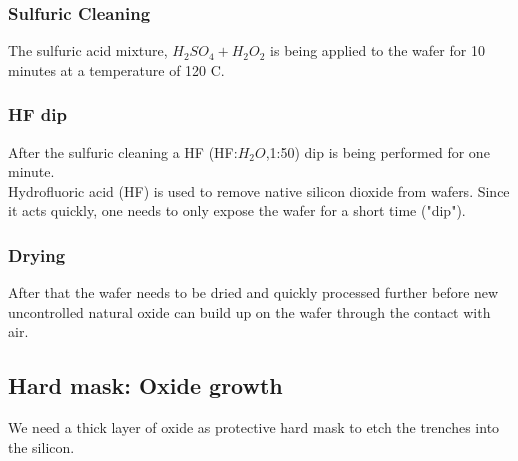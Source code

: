 \subsubsection{Sulfuric Cleaning}
The sulfuric acid mixture, $H_2 S O_4 + H_2 O_2$ is being applied to the wafer for 10 minutes at a temperature of 120 \degree C.

\subsubsection{HF dip}
After the sulfuric cleaning a HF (HF:$H_2O$,1:50) dip is being performed for one minute. \\
Hydrofluoric acid (HF) is used to remove native silicon dioxide from wafers. Since it acts quickly, one needs to only expose the wafer for a short time ("dip").

\subsubsection{Drying}
After that the wafer needs to be dried and quickly processed further before new uncontrolled natural oxide can build up on the wafer through the contact with air.

\subsection{Hard mask: Oxide growth}
We need a thick layer of oxide as protective hard mask to etch the trenches into the silicon.

